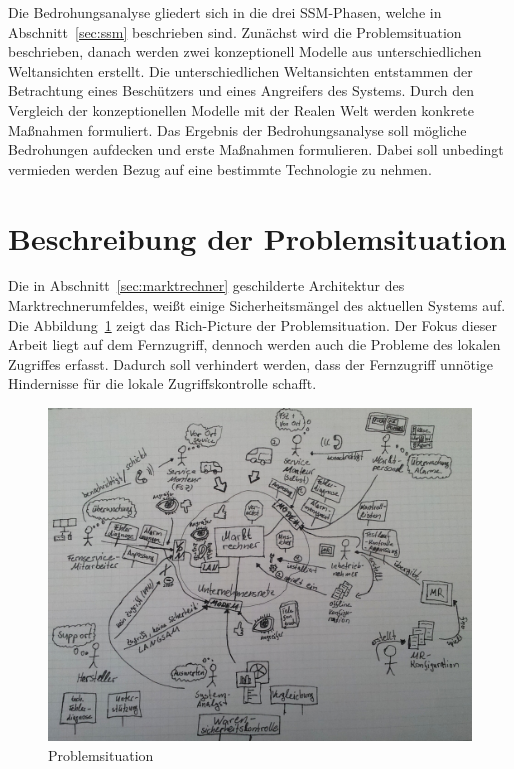 \documentclass[11pt,a4paper]{report}
\begin{document}
Die Bedrohungsanalyse gliedert sich in die drei SSM-Phasen, welche in Abschnitt~\ref{sec:ssm} beschrieben sind. Zunächst wird die Problemsituation beschrieben, danach werden zwei konzeptionell Modelle aus unterschiedlichen Weltansichten erstellt. Die unterschiedlichen Weltansichten entstammen der Betrachtung eines Beschützers und eines Angreifers des Systems. Durch den Vergleich der konzeptionellen Modelle mit der Realen Welt werden konkrete Maßnahmen formuliert. Das Ergebnis der Bedrohungsanalyse soll mögliche Bedrohungen aufdecken und erste Maßnahmen formulieren. Dabei soll unbedingt vermieden werden Bezug auf eine bestimmte Technologie zu nehmen.

\section{Beschreibung der Problemsituation} \label{sec:problem_situation}

Die in Abschnitt~\ref{sec:marktrechner} geschilderte Architektur des Marktrechnerumfeldes, weißt einige Sicherheitsmängel des aktuellen Systems auf. Die Abbildung~\ref{fig:problem_situation} zeigt das Rich-Picture der Problemsituation. Der Fokus dieser Arbeit liegt auf dem Fernzugriff, dennoch werden auch die Probleme des lokalen Zugriffes erfasst. Dadurch soll verhindert werden, dass der Fernzugriff unnötige Hindernisse für die lokale Zugriffskontrolle schafft. 

\begin{figure}[htb]
\centering
\includegraphics[scale=0.215]{images/problemsituation.jpg}
\caption{Problemsituation}
\label{fig:problem_situation}
\end{figure}
\end{document}
